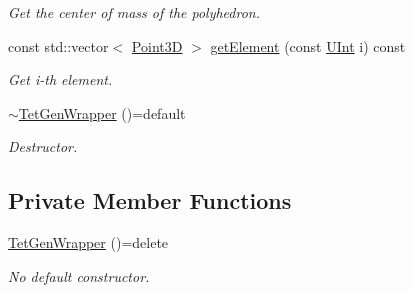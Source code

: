 \begin{DoxyCompactItemize}
\begin{DoxyCompactList}\small\item\em Get the center of mass of the polyhedron. \end{DoxyCompactList}\item 
const std\+::vector$<$ \hyperlink{classFVCode3D_1_1Point3D}{Point3D} $>$ \hyperlink{classFVCode3D_1_1TetGenWrapper_aa078ba35c38e79cae708b7fd632ceac4}{get\+Element} (const \hyperlink{namespaceFVCode3D_a4bf7e328c75d0fd504050d040ebe9eda}{U\+Int} i) const 
\begin{DoxyCompactList}\small\item\em Get i-\/th element. \end{DoxyCompactList}\item 
\hyperlink{classFVCode3D_1_1TetGenWrapper_a899fb8723246a4c6684ad447a1e0608d}{$\sim$\+Tet\+Gen\+Wrapper} ()=default
\begin{DoxyCompactList}\small\item\em Destructor. \end{DoxyCompactList}\end{DoxyCompactItemize}
\subsection*{Private Member Functions}
\begin{DoxyCompactItemize}
\item 
\hyperlink{classFVCode3D_1_1TetGenWrapper_ac89da37a0ce92c84ab8c74829031192e}{Tet\+Gen\+Wrapper} ()=delete
\begin{DoxyCompactList}\small\item\em No default constructor. \end{DoxyCompactList}\end{DoxyCompactItemize}
